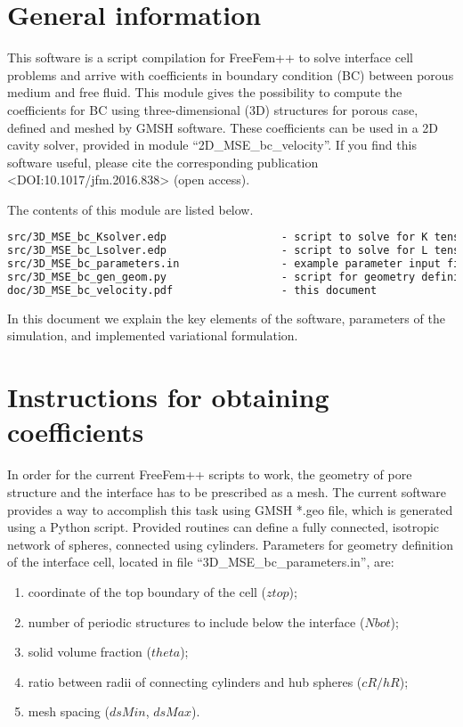 \documentclass[12pt,a4paper]{article}
\begin{document}
\sloppy

\section{General information}

This software is a script compilation for FreeFem++ to solve interface cell problems and arrive with coefficients in boundary condition (BC) between porous medium and free fluid. This module gives the possibility to compute the coefficients for BC using three-dimensional (3D) structures for porous case, defined and meshed by GMSH software. These coefficients can be used in a 2D cavity solver, provided in module ``2D\_MSE\_bc\_velocity''. If you find this software useful, please cite the corresponding publication <DOI:10.1017/jfm.2016.838> (open access).

The contents of this module are listed below.
\begin{lstlisting}[language=tex]
src/3D_MSE_bc_Ksolver.edp                  - script to solve for K tensor
src/3D_MSE_bc_Lsolver.edp                  - script to solve for L tensor
src/3D_MSE_bc_parameters.in                - example parameter input file
src/3D_MSE_bc_gen_geom.py                  - script for geometry definition in GMSH *.geo format
doc/3D_MSE_bc_velocity.pdf                 - this document
\end{lstlisting}

In this document we explain the key elements of the software, parameters of the simulation, and implemented variational formulation.

\section{Instructions for obtaining coefficients}


In order for the current FreeFem++ scripts to work, the geometry of pore structure and the interface has to be prescribed as a mesh. The current software provides a way to accomplish this task using GMSH *.geo file, which is generated using a Python script. Provided routines can define a fully connected, isotropic network of spheres, connected using cylinders. Parameters for geometry definition of the interface cell, located in file ``3D\_MSE\_bc\_parameters.in'', are:
\begin{enumerate}
    \item coordinate of the top boundary of the cell ($ztop$);
	\item number of periodic structures to include below the interface ($Nbot$);
    \item solid volume fraction ($theta$);
    \item ratio between radii of connecting cylinders and hub spheres ($cR/hR$);
    \item mesh spacing ($dsMin$, $dsMax$).
\end{enumerate}
\end{document}
